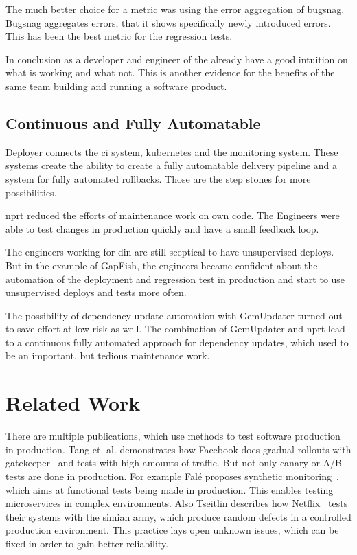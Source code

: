 The much better choice for a metric was using the error aggregation of bugsnag. Bugsnag
aggregates errors, that it shows specifically newly introduced errors. This has been the
best metric for the regression tests.


In conclusion as a developer and engineer of the already have a good intuition on what is
working and what not. This is another evidence for the benefits of the same team building
and running a software product.

\subsection{Continuous and Fully Automatable}

Deployer connects the \gls{ci} system, kubernetes and the monitoring system. These systems
create the ability to create a fully automatable delivery pipeline and a system for fully
automated rollbacks. Those are the step stones for more possibilities.

\gls{nprt} reduced the efforts of maintenance work on own code. The Engineers were able to
test changes in production quickly and have a small feedback loop.

The engineers working for \gls{din} are still sceptical to have unsupervised deploys. But in the
example of GapFish, the engineers became confident about the automation of the deployment
and regression test in production and start to use unsupervised deploys and tests more often.

The possibility of dependency update automation with GemUpdater turned out to save effort
at low risk as well. The combination of GemUpdater and \gls{nprt} lead to a continuous
fully automated approach for dependency updates, which used to be an important, but
tedious maintenance work.

\section{Related Work}

There are multiple publications, which use methods to test software production in
production. Tang et. al. demonstrates how Facebook does gradual rollouts with
gatekeeper~\cite{fb_config_management} and tests with high amounts of traffic. But not
only canary or A/B tests are done in production. For example Falé proposes synthetic
monitoring~\cite{synthmonitoring}, which aims at functional tests being made in
production. This enables testing microservices in complex environments. Also Tseitlin
describes how Netflix~\cite{antifragile_org} tests their systems with the simian army,
which produce random defects in a controlled production environment. This practice lays
open unknown issues, which can be fixed in order to gain better reliability.

